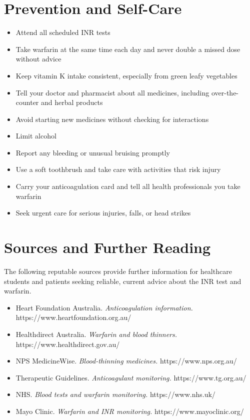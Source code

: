 \section*{Prevention and Self-Care}
\begin{itemize}
    \item Attend all scheduled INR tests
    \item Take warfarin at the same time each day and never double a missed dose without advice
    \item Keep vitamin K intake consistent, especially from green leafy vegetables
    \item Tell your doctor and pharmacist about all medicines, including over-the-counter and herbal products
    \item Avoid starting new medicines without checking for interactions
    \item Limit alcohol
    \item Report any bleeding or unusual bruising promptly
    \item Use a soft toothbrush and take care with activities that risk injury
    \item Carry your anticoagulation card and tell all health professionals you take warfarin
    \item Seek urgent care for serious injuries, falls, or head strikes
\end{itemize}

\section*{Sources and Further Reading}
The following reputable sources provide further information for healthcare students and patients seeking reliable, current advice about the INR test and warfarin.
\begin{itemize}
    \item Heart Foundation Australia. \textit{Anticoagulation information.} https://www.heartfoundation.org.au/
    \item Healthdirect Australia. \textit{Warfarin and blood thinners.} https://www.healthdirect.gov.au/
    \item NPS MedicineWise. \textit{Blood-thinning medicines.} https://www.nps.org.au/
    \item Therapeutic Guidelines. \textit{Anticoagulant monitoring.} https://www.tg.org.au/
    \item NHS. \textit{Blood tests and warfarin monitoring.} https://www.nhs.uk/
    \item Mayo Clinic. \textit{Warfarin and INR monitoring.} https://www.mayoclinic.org/
\end{itemize}
